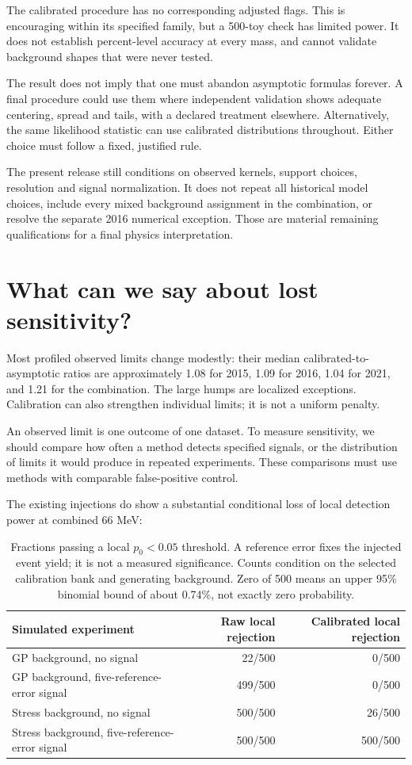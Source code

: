 \documentclass[11pt]{article}
\begin{document}
The calibrated procedure has no corresponding adjusted flags. This is encouraging within its specified family, but a 500-toy check has limited power. It does not establish percent-level accuracy at every mass, and cannot validate background shapes that were never tested.

The result does not imply that one must abandon asymptotic formulas forever. A final procedure could use them where independent validation shows adequate centering, spread and tails, with a declared treatment elsewhere. Alternatively, the same likelihood statistic can use calibrated distributions throughout. Either choice must follow a fixed, justified rule.

The present release still conditions on observed kernels, support choices, resolution and signal normalization. It does not repeat all historical model choices, include every mixed background assignment in the combination, or resolve the separate 2016 numerical exception. Those are material remaining qualifications for a final physics interpretation.

\clearpage
\section{What can we say about lost sensitivity?}
Most profiled observed limits change modestly: their median calibrated-to-asymptotic ratios are approximately 1.08 for 2015, 1.09 for 2016, 1.04 for 2021, and 1.21 for the combination. The large humps are localized exceptions. Calibration can also strengthen individual limits; it is not a uniform penalty.

An observed limit is one outcome of one dataset. To measure sensitivity, we should compare how often a method detects specified signals, or the distribution of limits it would produce in repeated experiments. These comparisons must use methods with comparable false-positive control.

The existing injections do show a substantial conditional loss of local detection power at combined 66 MeV:

\begin{table}[H]\centering\small
\begin{tabular}{lrr}\toprule
Simulated experiment & Raw local rejection & Calibrated local rejection\\\midrule
GP background, no signal & 22/500 & 0/500\\
GP background, five-reference-error signal & 499/500 & 0/500\\
Stress background, no signal & 500/500 & 26/500\\
Stress background, five-reference-error signal & 500/500 & 500/500\\
\bottomrule\end{tabular}
\caption{Fractions passing a local $p_0<0.05$ threshold. A reference error fixes the injected event yield; it is not a measured significance. Counts condition on the selected calibration bank and generating background. Zero of 500 means an upper 95\% binomial bound of about 0.74\%, not exactly zero probability.}
\end{table}
\end{document}
